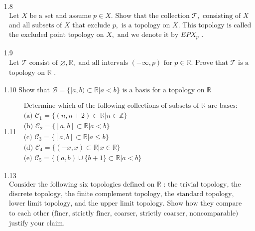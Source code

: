 \documentclass[12pt]{article}
\begin{document}
\begin{enumerate}
	\item[1.8]$  \begin{array} { l } { \text { Let } X \text { be a set and assume } p \in X . \text { Show that the collection } \mathcal { T } , \text { consisting of } X } \\ { \text { and all subsets of } X \text { that exclude } p , \text { is a topology on } X . \text { This topology is called } } \\ { \text { the excluded point topology on } X , \text { and we denote it by } E P X _ { p } \text { . } } \end{array} $
	
	\item[1.9]$  \begin{array} { l } { \text { Let } \mathcal { T } \text { consist of } \varnothing, \mathbb { R } , \text { and all intervals } ( - \infty , p ) \text { for } p \in \mathbb { R } . \text { Prove that } \mathcal { T } \text { is a } } \\ { \text { topology on } \mathbb { R } \text { . } } \end{array} $
	
	\item[1.10] Show that $ \mathcal { B } = \{ [ a , b ) \subset \mathbb { R } | a < b \} \text { is a basis for a topology on } \mathbb { R } $
	
	\item[1.11]$ \begin{array} { l } { \text { Determine which of the following collections of subsets of } \mathbb { R } \text { are bases: } } \\ { \text { (a) } \mathcal { C } _ { 1 } = \{ ( n , n + 2 ) \subset \mathbb { R } | n \in \mathbb { Z } \} } \\ { \text { (b) } \mathcal { C } _ { 2 } = \{ [ a , b ] \subset \mathbb { R } | a < b \} } \\ { \text { (c) } \mathcal { C } _ { 3 } = \{ [ a , b ] \subset \mathbb { R } | a \leq b \} } \\ { \text { (d) } \mathcal { C } _ { 4 } = \{ ( - x , x ) \subset \mathbb { R } | x \in \mathbb { R } \} } \\ { \text { (e) } \mathcal { C } _ { 5 } = \{ ( a , b ) \cup \{ b + 1 \} \subset \mathbb { R } | a < b \} } \end{array} $
	
	\item[1.13]$ \begin{array} { l } { \text { Consider the following six topologies defined on } \mathbb { R } \text { : the trivial topology, the } } \\ { \text { discrete topology, the finite complement topology, the standard topology, the } } \\ { \text { lower limit topology, and the upper limit topology. Show how they compare } } \\ { \text { to each other (finer, strictly finer, coarser, strictly coarser, noncomparable) and } } \\ { \text { justify your claim. } } \end{array} $
	

\end{enumerate}
\end{document}
